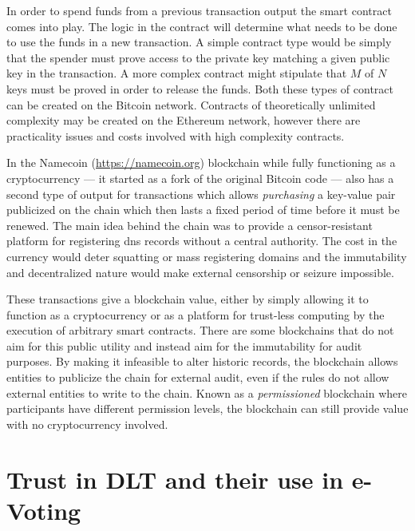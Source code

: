 In order to spend funds from a previous transaction output the smart contract comes into play. The logic in the contract will determine what needs to be done to use the funds in a new transaction. A simple contract type would be simply that the spender must prove access to the private key matching a given public key in the transaction. A more complex contract might stipulate that $M$ of $N$ keys must be proved in order to release the funds. Both these types of contract can be created on the Bitcoin network. Contracts of theoretically unlimited complexity may be created on the Ethereum network, however there are practicality issues and costs involved with high complexity contracts.


In the Namecoin (\url{https://namecoin.org}) blockchain while fully functioning as a cryptocurrency --- it started as a fork of the original Bitcoin code --- also has a second type of output for transactions which allows \emph{purchasing} a key-value pair publicized on the chain which then lasts a fixed period of time before it must be renewed. The main idea behind the chain was to provide a censor-resistant platform for registering \gls{dns} records without a central authority. The cost in the currency would deter squatting or mass registering domains and the immutability and decentralized nature would make external censorship or seizure impossible.

These transactions give a blockchain value, either by simply allowing it to function as a cryptocurrency or as a platform for trust-less computing by the execution of arbitrary smart contracts. There are some blockchains that do not aim for this public utility and instead aim for the immutability for audit purposes. By making it infeasible to alter historic records, the blockchain allows entities to publicize the chain for external audit, even if the rules do not allow external entities to write to the chain. Known as a \emph{permissioned} blockchain where participants have different permission levels, the blockchain can still provide value with no cryptocurrency involved.

\section{Trust in DLT and their use in e-Voting}
\label{ch:blockchain:trust}

